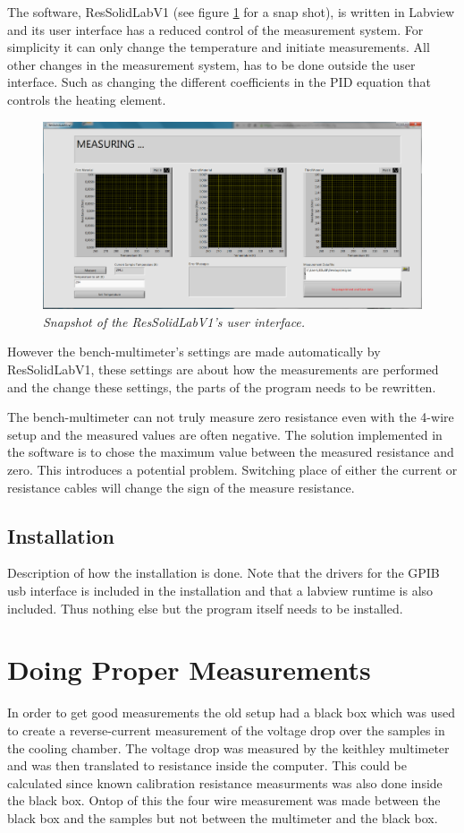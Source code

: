 \documentclass[a4paper,12pt]{article}
\begin{document}
The software, ResSolidLabV1 (see figure \ref{fig:UI} for a snap shot), is written in Labview and its user interface has a reduced control of the measurement system. For simplicity it can only change the temperature and initiate measurements. All other changes in the measurement system, has to be done outside the user interface. Such as changing the different coefficients in the PID equation that controls the heating element. 


\begin{figure}[H]
	\includegraphics[width=1\textwidth]{ResSolidLabV1UI}
	\caption{\emph{Snapshot of the ResSolidLabV1's user interface.}}
	\label{fig:UI}
\end{figure}

However the bench-multimeter's settings are made automatically by ResSolidLabV1, these settings are about how the measurements are performed and the change these settings, the parts of the program needs to be rewritten.

The  bench-multimeter can not truly measure zero resistance even with the 4-wire setup and the measured values are often negative. The solution implemented in the software is to chose the maximum value between the measured resistance and zero. This introduces a potential problem. Switching place of either the current or resistance cables will change the sign of the measure resistance.

\subsection{Installation}
Description of how the installation is done. Note that the drivers for the GPIB usb interface is included in the installation and that a labview runtime is also included. Thus nothing else but the program itself needs to be installed.

\section{Doing Proper Measurements}
In order to get good measurements the old setup had a black box which was used to create a reverse-current measurement of the voltage drop over the samples in the cooling chamber. The voltage drop was measured by the keithley multimeter and was then translated to resistance inside the computer. This could be calculated since known calibration resistance measurments was also done inside the black box. Ontop of this the four wire measurement was made between the black box and the samples but not between the multimeter and the black box.
\end{document}
